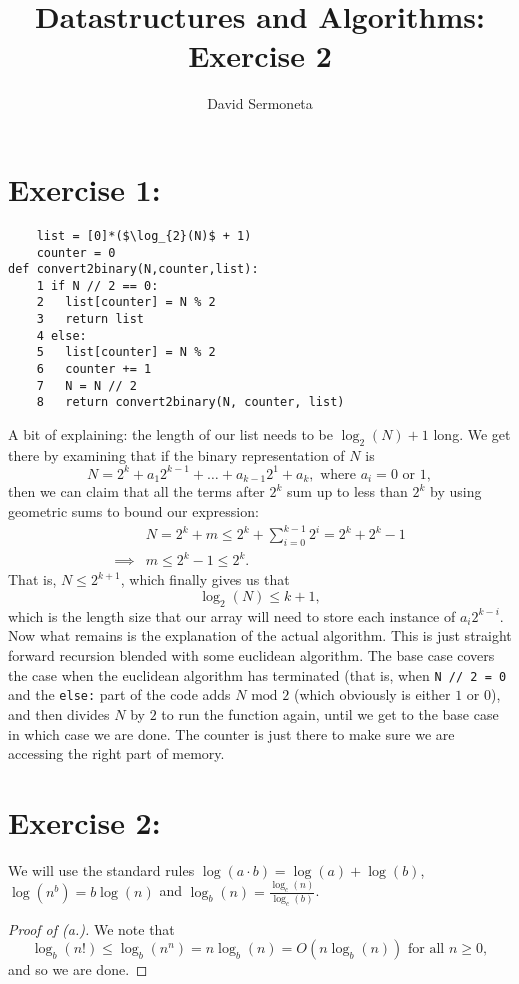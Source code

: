 \documentclass{article}
\title{Datastructures and Algorithms: Exercise 2}
\author{David Sermoneta}
\begin{document}
\maketitle
\section*{Exercise 1:}
\begin{lstlisting}
    list = [0]*($\log_{2}(N)$ + 1)
    counter = 0
def convert2binary(N,counter,list):
    1 if N // 2 == 0:
    2   list[counter] = N % 2
    3   return list
    4 else:
    5   list[counter] = N % 2
    6   counter += 1
    7   N = N // 2
    8   return convert2binary(N, counter, list)
\end{lstlisting}
A bit of explaining: the length of our list needs to be $\log_2(N)+1$ long. We get there
by examining that if the binary representation of $N$ is  
\[N = 2^{k} + a_1 2^{k-1} + \ldots + a_{k-1}2^{1} + a_{k}, \text{ where } a_{i}	= 0 \text{ 
 or }1,\] then we can claim that all the terms after $2^{k}$ sum up to less than $2^{k}$ by using
 geometric sums to bound our expression: 
 \begin{align*}
  &N = 2^{k} + m  \leq  2^{k } + \sum\limits_{i=0}^{k-1} 2^{i} = 2^{k} + 2^{k}  - 1  \\
     \implies & m \leq  2^{k} - 1 \leq  2^{k}.
 \end{align*} That is, $N \leq  2^{k+1}$, which finally gives us that \[
 \log_{2}(N) \leq k+1,
 \] which is the length size that our array will need to store each instance of $a_{i}2^{k-i}$. \\
 \noindent Now what remains is the explanation of the actual algorithm. This is just straight 
 forward recursion blended with some euclidean algorithm. The base case covers the case when 
the euclidean algorithm has terminated (that is, when \texttt{N // 2 = 0} and the \texttt{else:}
part of the code adds $N \text{ mod } 2$ (which obviously is either $1$ or $0$), 
and then divides $N$ by $2$ to run the function again, until we get to the base case in 
which case we are done. The counter is just there to make sure we are accessing the right
part of memory.


\section*{Exercise 2:}
We will use the standard rules $\log(a\cdot b) = \log(a) + \log(b)$, $\log(n^{b})=
b\log(n)$ and $\log_{b}(n) = \frac{\log_{c}(n)}{\log_{c}(b)}$.
\begin{proof}[Proof of (a.)]
We note that  \[
\log_{b}(n!) \leq  \log_{b}(n^{n}) = n\log_{b}(n) = O(n\log_{b}(n)) \text{ for all } n\geq 0,
\] and so we are done.
\end{proof}
\end{document}
